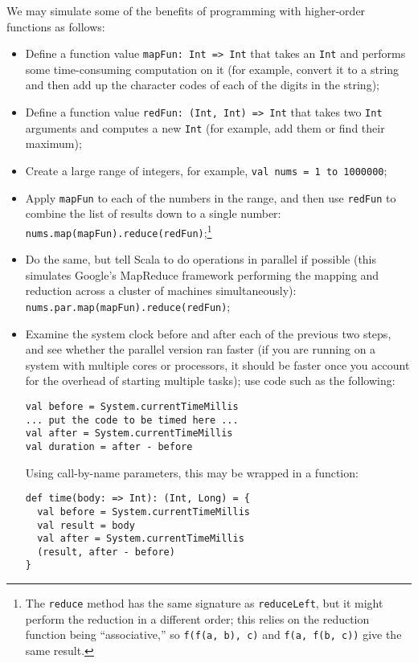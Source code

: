 \begin{exercises}
\item We may simulate some of the benefits of programming with higher-order functions as follows:
\begin{itemize}
\item Define a function value \verb|mapFun: Int => Int| that takes an \texttt{Int} and performs some time-consuming computation on it (for example, convert it to a string and then add up the character codes of each of the digits in the string);
\item Define a function value \verb|redFun: (Int, Int) => Int| that takes two \texttt{Int} arguments and computes a new \texttt{Int} (for example, add them or find their maximum);
\item Create a large range of integers, for example, \texttt{val nums = 1 to 1000000};
\item Apply \texttt{mapFun} to each of the numbers in the range, and then use \texttt{redFun} to combine the list of results down to a single number: \verb|nums.map(mapFun).reduce(redFun)|;\footnote{The \texttt{reduce} method has the same signature as \texttt{reduceLeft}, but it might perform the reduction in a different order; this relies on the reduction function being ``associative,'' so \texttt{f(f(a, b), c)} and \texttt{f(a, f(b, c))} give the same result.}
\item Do the same, but tell Scala to do operations in parallel if possible (this simulates Google's MapReduce framework performing the mapping and reduction across a cluster of machines simultaneously): \verb|nums.par.map(mapFun).reduce(redFun)|;
\item Examine the system clock before and after each of the previous two steps, and see whether the parallel version ran faster (if you are running on a system with multiple cores or processors, it should be faster once you account for the overhead of starting multiple tasks); use code such as the following:
\begin{verbatim}
val before = System.currentTimeMillis
... put the code to be timed here ...
val after = System.currentTimeMillis
val duration = after - before
\end{verbatim}
Using call-by-name parameters, this may be wrapped in a function:
\begin{verbatim}
def time(body: => Int): (Int, Long) = {
  val before = System.currentTimeMillis
  val result = body
  val after = System.currentTimeMillis
  (result, after - before)
}
\end{verbatim}
\end{itemize}
\end{exercises}

